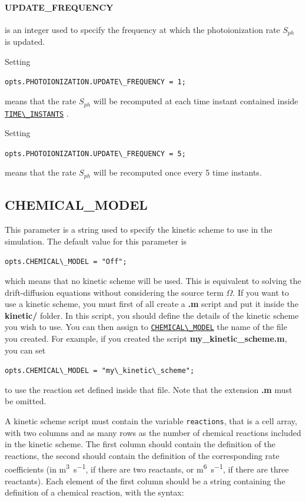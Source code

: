 \documentclass[12pt,a4paper]{article}
\newcommand{\matlabs}[1]{{\lstinline[style=MatlabStyle]!#1!}}
\newcommand{\seclink}[2]{%
	\begingroup
	\hypersetup{linkcolor=orange}%
	\hyperref[sec:#1]{\matlabs{#2}}%
	\endgroup
}
\begin{document}
	
	\paragraph{UPDATE\_FREQUENCY} is an integer used to specify the frequency at which the photoionization rate $S_{ph}$ is updated. 

	\noindent Setting 
	
	\matlabs{opts.PHOTOIONIZATION.UPDATE\_FREQUENCY = 1;} 
	
	\noindent means that the rate $S_{ph}$ will be recomputed at each time instant contained inside \\ \seclink{timeinst}{TIME\_INSTANTS}.
	
	\noindent Setting 
	
	\matlabs{opts.PHOTOIONIZATION.UPDATE\_FREQUENCY = 5;} 
	
	\noindent means that the rate $S_{ph}$ will be recomputed once every 5 time instants.
	
	
	\subsection{CHEMICAL\_MODEL}
	\label{sec:chemicalmodel}
	This parameter is a string used to specify the kinetic scheme to use in the simulation.
	The default value for this parameter is
	
	\matlabs{opts.CHEMICAL\_MODEL = "Off";}
	
	\noindent which means that no kinetic scheme will be used. This is equivalent to solving the drift-diffusion equations without considering the source term $\Omega$. If you want to use a kinetic scheme, you must first of all create a \textbf{.m} script and put it inside the \textbf{kinetic/} folder. In this script, you should define the details of the kinetic scheme you wish to use. You can then assign to \seclink{chemicalmodel}{CHEMICAL\_MODEL} the name of the file you created. For example, if you created the script \textbf{my\_kinetic\_scheme.m}, you can set
	
	\matlabs{opts.CHEMICAL\_MODEL = "my\_kinetic\_scheme";}
	
	\noindent to use the reaction set defined inside that file. Note that the extension \textbf{.m} must be omitted.
	
	A kinetic scheme script must contain the variable \matlabs{reactions}, that is a cell array, with two columns and as many rows as the number of chemical reactions included in the kinetic scheme. The first column should contain the definition of the reactions, the second should contain the definition of the corresponding rate coefficients (in \unit{\cubic\meter\per\second}, if there are two reactants, or \unit{\metre\tothe{6}\per\second}, if there are three reactants). 
	Each element of the first column should be a string containing the definition of a chemical reaction, with the syntax:
	
\end{document}
